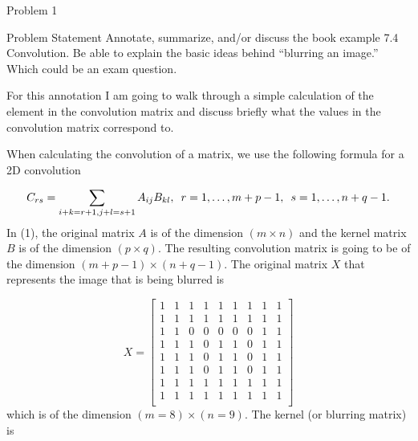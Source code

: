 \begin{problem}{Problem 1}
    \begin{statement}{Problem Statement}
        Annotate, summarize, and/or discuss the book example 7.4 Convolution. Be able to explain the basic ideas behind “blurring an image.” Which could be an exam question.
    \end{statement}

    \begin{highlight}[Solution]
        For this annotation I am going to walk through a simple calculation of the element in the convolution matrix and discuss briefly what the values in the convolution matrix correspond to. \vspace*{1em}

        When calculating the convolution of a matrix, we use the following formula for a 2D convolution

        \setcounter{equation}{0}
        \begin{equation}
            C_{rs} = \sum_{i + k = r + 1, j + l = s + 1} A_{ij}B_{kl}, \hspace*{5pt} r = 1, \dots, m + p - 1, \hspace*{5pt} s = 1, \dots, n + q - 1.
        \end{equation}
        In (1), the original matrix $A$ is of the dimension $(m \times n)$ and the kernel matrix $B$ is of the dimension $(p \times q)$. The resulting convolution matrix is going to be of the dimension 
        $(m + p - 1) \times (n + q - 1)$. The original matrix $X$ that represents the image that is being blurred is

        \begin{equation}
            X = 
            \begin{bmatrix}
                1 & 1 & 1 & 1 & 1 & 1 & 1 & 1 & 1 \\
                1 & 1 & 1 & 1 & 1 & 1 & 1 & 1 & 1 \\
                1 & 1 & 0 & 0 & 0 & 0 & 0 & 1 & 1 \\
                1 & 1 & 1 & 0 & 1 & 1 & 0 & 1 & 1 \\
                1 & 1 & 1 & 0 & 1 & 1 & 0 & 1 & 1 \\
                1 & 1 & 1 & 0 & 1 & 1 & 0 & 1 & 1 \\
                1 & 1 & 1 & 1 & 1 & 1 & 1 & 1 & 1 \\
                1 & 1 & 1 & 1 & 1 & 1 & 1 & 1 & 1 \\
            \end{bmatrix}
        \end{equation}
        which is of the dimension $(m = 8) \times (n = 9)$. The kernel (or blurring matrix) is 


\end{highlight}
\end{problem}
